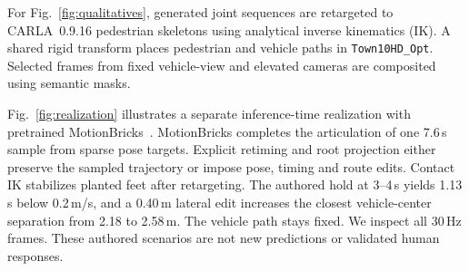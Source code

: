 For Fig.~\ref{fig:qualitatives}, generated joint sequences are retargeted to
CARLA~0.9.16 pedestrian skeletons using analytical inverse kinematics (IK). A shared rigid
transform places pedestrian and vehicle paths in \texttt{Town10HD\_Opt}.
Selected frames from fixed vehicle-view and elevated cameras are
composited using semantic masks.

Fig.~\ref{fig:realization} illustrates a separate inference-time realization
with pretrained MotionBricks~\cite{wang2026motionbricks}. MotionBricks completes
the articulation of one 7.6\,s sample from sparse pose targets. Explicit retiming and root projection
either preserve the sampled trajectory or impose pose, timing and route edits.
Contact IK stabilizes planted feet after retargeting. The authored hold at 3--4\,s
yields 1.13\,s below 0.2\,m/s, and a 0.40\,m lateral edit increases the closest
vehicle-center separation from 2.18 to 2.58\,m. The vehicle path stays fixed.
We inspect all 30\,Hz frames. These authored scenarios are not new
\method predictions or validated human responses.
